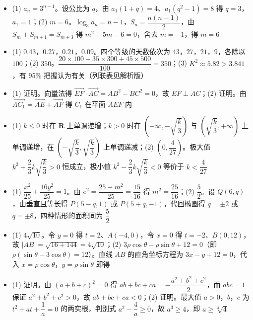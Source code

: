 \begin{itemize}[leftmargin=2.6em]
  \item[\textbf{17.}] (1) $a_n=3^{n-1}$。设公比为 $q$，由 $a_1(1+q)=4$、$a_1(q^2-1)=8$ 得 $q=3$，$a_1=1$；(2) $m=6$。$\log_3a_n=n-1$，$S_n=\dfrac{n(n-1)}2$，由 $S_m+S_{m+1}=S_{m+3}$ 得 $m^2-5m-6=0$，舍去 $m=-1$，得 $m=6$
  \item[\textbf{18.}] (1) $0.43$，$0.27$，$0.21$，$0.09$。四个等级的天数依次为 $43$，$27$，$21$，$9$，各除以 $100$；(2) $350$。$\dfrac{20\times100+35\times300+45\times500}{100}=350$；(3) $K^2\approx5.82>3.841$，有 95\% 把握认为有关（列联表见解析版）
  \item[\textbf{19.}] (1) 证明。向量法得 $\overrightarrow{EF}\cdot\overrightarrow{AC}=AB^2-BC^2=0$，故 $EF\perp AC$；(2) 证明。由 $\overrightarrow{AC_1}=\overrightarrow{AE}+\overrightarrow{AF}$ 得 $C_1$ 在平面 $AEF$ 内
  \item[\textbf{20.}] (1) $k\leqslant0$ 时在 $\mathbf R$ 上单调递增；$k>0$ 时在 $\left(-\infty,-\sqrt{\dfrac k3}\right)$ 与 $\left(\sqrt{\dfrac k3},+\infty\right)$ 上单调递增，在 $\left(-\sqrt{\dfrac k3},\sqrt{\dfrac k3}\right)$ 上单调递减；(2) $\left(0,\dfrac4{27}\right)$。极大值 $k^2+\dfrac23k\sqrt{\dfrac k3}>0$ 恒成立，极小值 $k^2-\dfrac23k\sqrt{\dfrac k3}<0$ 等价于 $k<\dfrac4{27}$
  \item[\textbf{21.}] (1) $\dfrac{x^2}{25}+\dfrac{16y^2}{25}=1$。由 $e^2=\dfrac{25-m^2}{25}=\dfrac{15}{16}$ 得 $m^2=\dfrac{25}{16}$；(2) $\dfrac52$。设 $Q(6,q)$，由垂直且等长得 $P(5-q,1)$ 或 $P(5+q,-1)$，代回椭圆得 $q=\pm2$ 或 $q=\pm8$，四种情形的面积同为 $\dfrac52$
\end{itemize}

\begin{itemize}[leftmargin=2.6em]
  \item[\textbf{22.}] (1) $4\sqrt{10}$。令 $y=0$ 得 $t=2$、$A(-4,0)$，令 $x=0$ 得 $t=-2$、$B(0,12)$，故 $|AB|=\sqrt{16+144}=4\sqrt{10}$；(2) $3\rho\cos\theta-\rho\sin\theta+12=0$（即 $\rho(\sin\theta-3\cos\theta)=12$）。直线 $AB$ 的直角坐标方程为 $3x-y+12=0$，代入 $x=\rho\cos\theta$，$y=\rho\sin\theta$ 即得
  \item[\textbf{23.}] (1) 证明。由 $(a+b+c)^2=0$ 得 $ab+bc+ca=-\dfrac{a^2+b^2+c^2}2$，而 $abc=1$ 保证 $a^2+b^2+c^2>0$，故 $ab+bc+ca<0$；(2) 证明。最大值 $a>0$，$b$，$c$ 为 $t^2+at+\dfrac1a=0$ 的两实根，判别式 $a^2-\dfrac4a\geqslant0$，故 $a^3\geqslant4$，即 $a\geqslant\sqrt[3]{4}$
\end{itemize}
